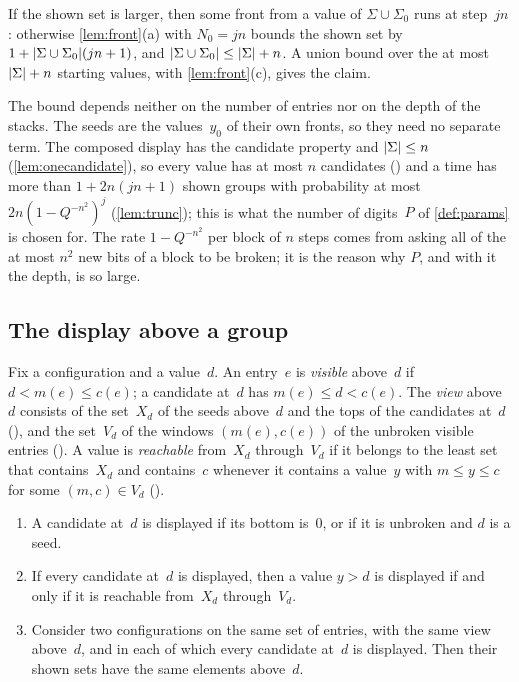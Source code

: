 \begin{outline}
If the shown set is larger, then some front from a value of $\Sigma\cup\Sigma_0$ runs at step~$jn$: otherwise \cref{lem:front}(a)
with $N_0=jn$ bounds the shown set by $1+\lvert \Sigma\cup\Sigma_0 \rvert(jn+1)$, and $\lvert \Sigma\cup\Sigma_0 \rvert\le\lvert \Sigma \rvert+n$. A
union bound over the at most $\lvert \Sigma \rvert+n$ starting values, with \cref{lem:front}(c), gives the claim.
\end{outline}

The bound depends neither on the number of entries nor on the depth of the stacks. The seeds are the values~$y_0$ of their own
fronts, so they need no separate term. The composed display has the candidate property and $\lvert \Sigma \rvert\le n$
(\cref{lem:onecandidate}), so every value has at most $n$ candidates () and a time has more than $1+2n(jn+1)$
shown groups with probability at most $2n(1-Q^{-n^2})^j$ (\cref{lem:trunc}); this is what the number of
digits~$P$ of \cref{def:params} is chosen for. The rate $1-Q^{-n^2}$ per block of $n$ steps comes from asking all of the at most
$n^2$ new bits of a block to be broken; it is the reason why $P$, and with it the depth, is so large.

\subsection{The display above a group}\label{sec:displays-view}

Fix a configuration and a value~$d$. An entry~$e$ is \emph{visible} above~$d$ if $d<m(e)\le c(e)$; a candidate at~$d$ has
$m(e)\le d<c(e)$. The \emph{view} above~$d$ consists of the set~$X_d$ of the seeds above~$d$ and the tops of the candidates at~$d$
(), and the set~$V_d$ of the windows $(m(e),c(e))$ of the unbroken visible entries (). A value is
\emph{reachable} from~$X_d$ through~$V_d$ if it belongs to the least set that contains~$X_d$ and contains~$c$ whenever it contains a
value~$y$ with $m\le y\le c$ for some $(m,c)\in V_d$ ().

\begin{lemma}\label{lem:view-static}
\begin{enumerate}[label=(\alph*)]
\item A candidate at~$d$ is displayed if its bottom is~$0$, or if it is unbroken and $d$ is a seed.
\item If every candidate at~$d$ is displayed, then a value $y>d$ is displayed if and only if it is reachable from~$X_d$
through~$V_d$.
\item Consider two configurations on the same set of entries, with the same view above~$d$, and in each of which every candidate
at~$d$ is displayed. Then their shown sets have the same elements above~$d$.
\end{enumerate}
\end{lemma}

